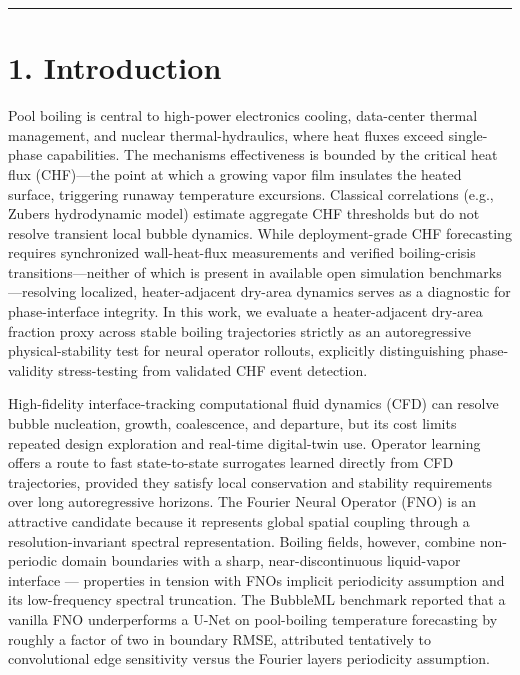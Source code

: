 \documentclass[preprint,12pt]{elsarticle}
\begin{document}
\begin{center}\rule{0.5\linewidth}{0.5pt}\end{center}

\section*{1. Introduction}\label{1-introduction}

Pool boiling is central to high-power electronics cooling, data-center
thermal management, and nuclear thermal-hydraulics, where heat fluxes
exceed single-phase capabilities. The mechanism\textquotesingle s
effectiveness is bounded by the critical heat flux (CHF)---the point at
which a growing vapor film insulates the heated surface, triggering
runaway temperature excursions. Classical correlations (e.g.,
Zuber\textquotesingle s hydrodynamic model) estimate aggregate CHF
thresholds but do not resolve transient local bubble dynamics. While
deployment-grade CHF forecasting requires synchronized wall-heat-flux
measurements and verified boiling-crisis transitions---neither of which
is present in available open simulation benchmarks---resolving
localized, heater-adjacent dry-area dynamics serves as a diagnostic for
phase-interface integrity. In this work, we evaluate a heater-adjacent
dry-area fraction proxy across stable boiling trajectories strictly as
an autoregressive physical-stability test for neural operator rollouts,
explicitly distinguishing phase-validity stress-testing from validated
CHF event detection.

High-fidelity interface-tracking computational fluid dynamics (CFD) can
resolve bubble nucleation, growth, coalescence, and departure, but its
cost limits repeated design exploration and real-time digital-twin use.
Operator learning offers a route to fast state-to-state surrogates
learned directly from CFD trajectories, provided they satisfy local
conservation and stability requirements over long autoregressive
horizons. The Fourier Neural Operator (FNO) is an attractive candidate
because it represents global spatial coupling through a
resolution-invariant spectral representation. Boiling fields, however,
combine non-periodic domain boundaries with a sharp, near-discontinuous
liquid-vapor interface --- properties in tension with
FNO\textquotesingle s implicit periodicity assumption and its
low-frequency spectral truncation. The BubbleML benchmark reported that
a vanilla FNO underperforms a U-Net on pool-boiling temperature
forecasting by roughly a factor of two in boundary RMSE, attributed
tentatively to convolutional edge sensitivity versus the Fourier
layer\textquotesingle s periodicity assumption.
\end{document}
